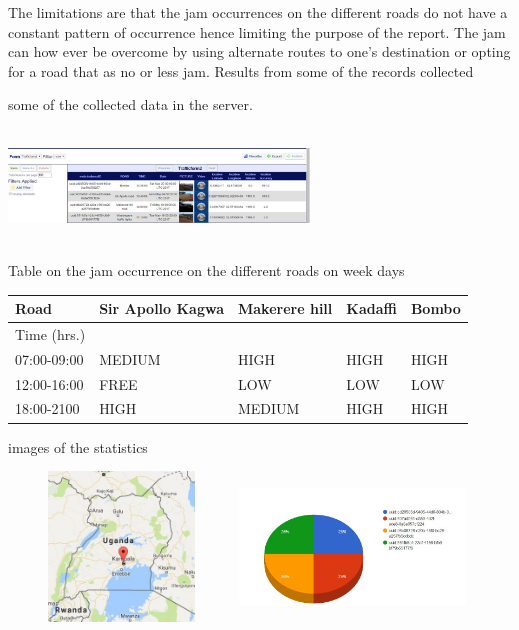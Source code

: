 \documentclass[options]{article}
\begin{document}
The limitations are that the jam occurrences on the different roads do not have a constant pattern of occurrence hence limiting the purpose of the report.
The jam can how ever be overcome by using alternate routes to one’s destination or opting for a road that as no or less jam.
Results from some of the records collected 

some of the collected data in the server.

\includegraphics[width =8cm,height=3cm]{Captureee.JPG}

Table on the jam occurrence on the different roads on week days

\begin{tabular}{|l|l|l|l|l|}
\hline
Road& Sir Apollo Kagwa & Makerere hill & Kadaffi & Bombo \\
\hline
Time (hrs.) &  & & & \\
\hline
07:00-09:00& MEDIUM &HIGH&HIGH&HIGH \\
\hline
12:00-16:00 &FREE  & LOW&LOW & LOW\\
\hline
18:00-2100&HIGH  &MEDIUM & HIGH& HIGH\\
\hline

\end{tabular}
  
images of the statistics 

\includegraphics[width =6cm,height=4cm]{Captuhhre.JPG}
\includegraphics[width =6cm,height=4cm]{Captufgtyre.JPG}
\end{document}
